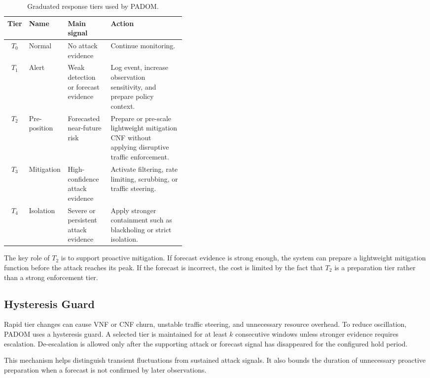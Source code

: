 \documentclass[12pt, a4paper, reqno, oneside]{book}
\newcommand{\padonap}{\textsc{PADOM}}
\begin{document}
\begin{table}[htbp]
\centering
\small
\caption{Graduated response tiers used by \padonap{}.}
\label{tab:tiers}
\begin{tabular}{@{}cllp{0.42\linewidth}@{}}
\toprule
Tier & Name & Main signal & Action \\
\midrule
$T_0$ & Normal &
No attack evidence &
Continue monitoring. \\

$T_1$ & Alert &
Weak detection or forecast evidence &
Log event, increase observation sensitivity, and prepare policy context. \\

$T_2$ & Pre-position &
Forecasted near-future risk &
Prepare or pre-scale lightweight mitigation CNF without applying disruptive
traffic enforcement. \\

$T_3$ & Mitigation &
High-confidence attack evidence &
Activate filtering, rate limiting, scrubbing, or traffic steering. \\

$T_4$ & Isolation &
Severe or persistent attack evidence &
Apply stronger containment such as blackholing or strict isolation. \\
\bottomrule
\end{tabular}
\end{table}

The key role of \(T_2\) is to support proactive mitigation. If forecast
evidence is strong enough, the system can prepare a lightweight mitigation
function before the attack reaches its peak. If the forecast is incorrect, the
cost is limited by the fact that \(T_2\) is a preparation tier rather than a
strong enforcement tier.

\subsection{Hysteresis Guard}
\label{subsec:hysteresis}

Rapid tier changes can cause VNF or CNF churn, unstable traffic steering, and
unnecessary resource overhead. To reduce oscillation, \padonap{} uses a
hysteresis guard. A selected tier is maintained for at least \(k\) consecutive
windows unless stronger evidence requires escalation. De-escalation is allowed
only after the supporting attack or forecast signal has disappeared for the
configured hold period.

This mechanism helps distinguish transient fluctuations from sustained attack
signals. It also bounds the duration of unnecessary proactive preparation when
a forecast is not confirmed by later observations.
\end{document}
